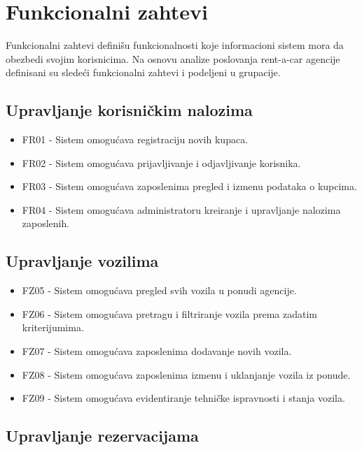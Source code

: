 
\section{Funkcionalni zahtevi}

Funkcionalni zahtevi definišu funkcionalnosti koje
informacioni sistem mora da obezbedi svojim korisnicima.
Na osnovu analize poslovanja rent-a-car agencije definisani
su sledeći funkcionalni zahtevi i podeljeni u grupacije.

\subsection{Upravljanje korisničkim nalozima}

\begin{itemize}
    \item FR01 - Sistem omogućava registraciju novih kupaca.
    \item FR02 - Sistem omogućava prijavljivanje i odjavljivanje korisnika.
    \item FR03 - Sistem omogućava zaposlenima pregled i izmenu podataka o kupcima.
    \item FR04 - Sistem omogućava administratoru kreiranje i upravljanje nalozima zaposlenih.
\end{itemize}

\subsection{Upravljanje vozilima}

\begin{itemize}
    \item FZ05 - Sistem omogućava pregled svih vozila u ponudi agencije.
    \item FZ06 - Sistem omogućava pretragu i filtriranje vozila prema zadatim kriterijumima.
    \item FZ07 - Sistem omogućava zaposlenima dodavanje novih vozila.
    \item FZ08 - Sistem omogućava zaposlenima izmenu i uklanjanje vozila iz ponude.
    \item FZ09 - Sistem omogućava evidentiranje tehničke ispravnosti i stanja vozila.
\end{itemize}

\subsection{Upravljanje rezervacijama}


